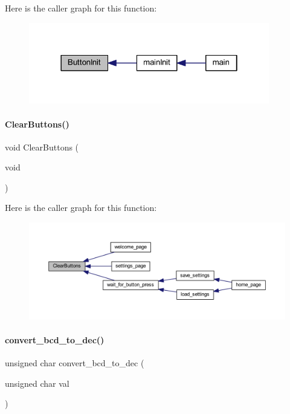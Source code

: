 Here is the caller graph for this function\+:
\nopagebreak
\begin{figure}[H]
\begin{center}
\leavevmode
\includegraphics[width=298pt]{a00023_a30a1cff81be3c91e307685387401e863_icgraph}
\end{center}
\end{figure}
\mbox{\label{a00023_a034e39ae5657bf5b846d4ce5ff0a6047}} 
\paragraph{Clear\+Buttons()}
{\footnotesize\ttfamily void Clear\+Buttons (\begin{DoxyParamCaption}\item[{void}]{ }\end{DoxyParamCaption})}

Here is the caller graph for this function\+:
\nopagebreak
\begin{figure}[H]
\begin{center}
\leavevmode
\includegraphics[width=350pt]{a00023_a034e39ae5657bf5b846d4ce5ff0a6047_icgraph}
\end{center}
\end{figure}
\mbox{\label{a00023_a03795fe6451769e81af8ef69856e8acb}} 
\paragraph{convert\+\_\+bcd\+\_\+to\+\_\+dec()}
{\footnotesize\ttfamily unsigned char convert\+\_\+bcd\+\_\+to\+\_\+dec (\begin{DoxyParamCaption}\item[{unsigned char}]{val }\end{DoxyParamCaption})}

